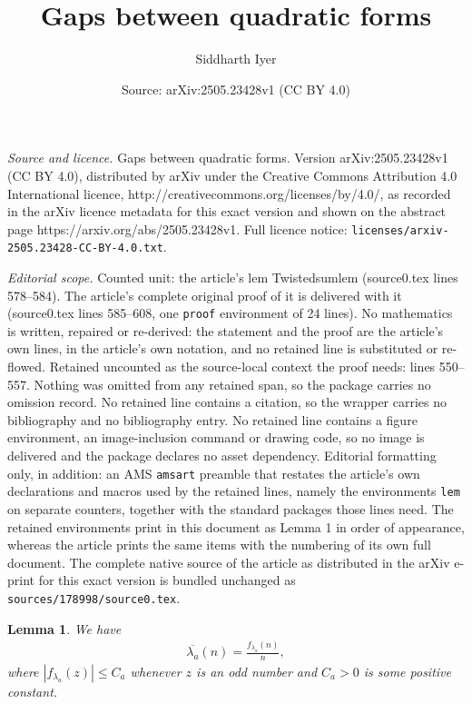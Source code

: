 \documentclass[10pt,a4paper]{amsart}
\title{Gaps between quadratic forms}
\author{Siddharth Iyer}
\date{Source: arXiv:2505.23428v1 (CC BY 4.0)}
\newtheorem{lem}{Lemma}
\begin{document}
\maketitle

\noindent\emph{Source and licence.} Gaps between quadratic forms. Version arXiv:2505.23428v1 (CC BY 4.0), distributed by arXiv under the Creative Commons Attribution 4.0 International licence, http://creativecommons.org/licenses/by/4.0/, as recorded in the arXiv licence metadata for this exact version and shown on the abstract page https://arxiv.org/abs/2505.23428v1. Full licence notice: \texttt{licenses/arxiv-2505.23428-CC-BY-4.0.txt}.\par\smallskip

\noindent\textit{Editorial scope.} Counted unit: the article's lem Twistedsumlem (source0.tex lines 578--584). The article's complete original proof of it is delivered with it (source0.tex lines 585--608, one \texttt{proof} environment of 24 lines). No mathematics is written, repaired or re-derived: the statement and the proof are the article's own lines, in the article's own notation, and no retained line is substituted or re-flowed.  Retained uncounted as the source-local context the proof needs: lines 550--557.  Nothing was omitted from any retained span, so the package carries no omission record.  No retained line contains a citation, so the wrapper carries no bibliography and no bibliography entry.  No retained line contains a figure environment, an image-inclusion command or drawing code, so no image is delivered and the package declares no asset dependency.  Editorial formatting only, in addition: an AMS \texttt{amsart} preamble that restates the article's own declarations and macros used by the retained lines, namely the environments \texttt{lem} on separate counters, together with the standard packages those lines need.  The retained environments print in this document as Lemma 1 in order of appearance, whereas the article prints the same items with the numbering of its own full document.  The complete native source of the article as distributed in the arXiv e-print for this exact version is bundled unchanged as \texttt{sources/178998/source0.tex}.
\begin{lem}
\label{lambdaconvbound}
We have
\begin{align*}
\overline{\lambda_{a}}(n) = \frac{f_{\lambda_{a}}(n)}{n},
\end{align*}
where $|f_{\lambda_{a}}(z)| \leq C_{a}$ whenever $z$ is an odd number and $C_{a}>0$ is some positive constant.
\end{lem}
\end{document}
